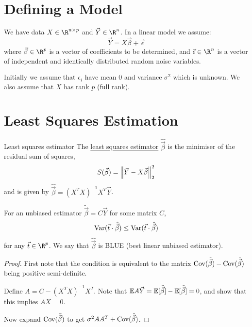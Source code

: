\documentclass[../Main.tex]{subfiles}
\begin{document}
\section{Defining a Model}
We have data $X \in \R^{n \times p}$ and $\vec{Y} \in \R^n$. In a linear model we assume:
\begin{equation*}
    \vec{Y} = X\vec{\beta} + \vec{\epsilon}
\end{equation*}
where $\vec{\beta} \in \R^p$ is a vector of coefficients to be determined, and $\vec{\epsilon} \in \R^n$ is a vector of independent and identically distributed random noise variables.

Initially we assume that $\epsilon_i$ have mean $0$ and variance $\sigma^2$ which is unknown. We also assume that $X$ has rank $p$ (full rank).
\section{Least Squares Estimation}
\begin{definition}{Least squares estimator}
    The \underline{least squares estimator} $\hat{\vec{\beta}}$ is the minimiser of the residual sum of squares,
    \begin{equation*}
        S(\vec{\beta}) = \left\|\vec{Y} - X \vec{\beta}\right\|_2^2
    \end{equation*}
    and is given by $\hat{\vec{\beta}} = (X^TX)^{-1} X^T \vec{Y}$.
\end{definition}
\begin{theorem}
    For an unbiased estimator $\tilde{\vec{\beta}} = C\vec{Y}$ for some matrix $C$,
    \begin{equation*}
        \operatorname{Var}(\vec{t} \cdot \hat{\vec{\beta}}) \leq \operatorname{Var}(\vec{t} \cdot \hat{\vec{\beta}})
    \end{equation*}
    for any $\vec{t} \in \R^p$. We say that $\hat{\vec{\beta}}$ is BLUE (best linear unbiased estimator).
    \label{thmGaussMarkov}
\end{theorem}
\begin{proof}
    First note that the condition is equivalent to the matrix $\operatorname{Cov}(\tilde{\vec{\beta}}) - \operatorname{Cov}(\hat{\vec{\beta}})$ being positive semi-definite.

    Define $A = C - (X^TX)^{-1} X^T$. Note that $\mathbb{E}{A\vec{Y}} = \mathbb{E}[\tilde{\vec{\beta}}] - \mathbb{E}[\hat{\vec{\beta}}] = 0$, and show that this implies $AX = 0$.

    Now expand $\operatorname{Cov}(\tilde{\vec{\beta}})$ to get $\sigma^2 AA^T + \operatorname{Cov}(\hat{\vec{\beta}})$.
\end{proof}
\end{document}
